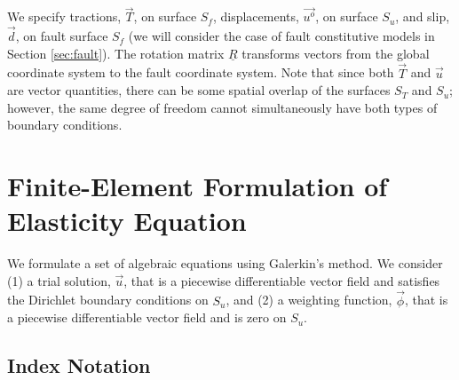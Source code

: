 We specify tractions, $\vec{T}$, on surface $S_{f}$, displacements,
$\overrightarrow{u^{o}}$, on surface $S_{u}$, and slip, $\vec{d}$,
on fault surface $S_{f}$ (we will consider the case of fault constitutive
models in Section \vref{sec:fault}). The rotation matrix $\underline{R}$
transforms vectors from the global coordinate system to the fault
coordinate system. Note that since both $\overrightarrow{T}$ and
$\overrightarrow{u}$ are vector quantities, there can be some spatial
overlap of the surfaces $S_{T}$ and $S_{u}$; however, the same degree
of freedom cannot simultaneously have both types of boundary conditions.

\section{Finite-Element Formulation of Elasticity Equation}

We formulate a set of algebraic equations using Galerkin's method.
We consider (1) a trial solution, $\vec{u}$, that is a piecewise
differentiable vector field and satisfies the Dirichlet boundary conditions
on $S_{u}$, and (2) a weighting function, $\vec{\phi}$, that is
a piecewise differentiable vector field and is zero on $S_{u}$.

\subsection{Index Notation}

